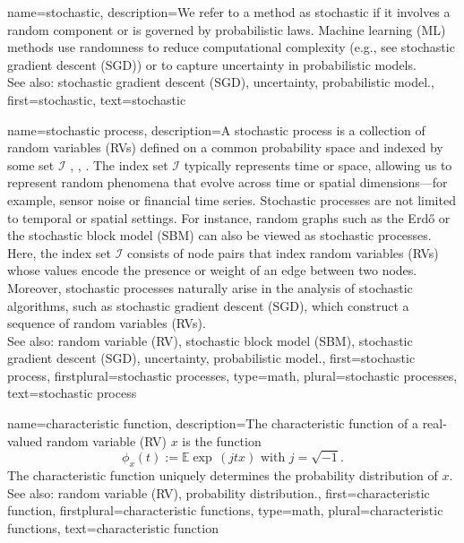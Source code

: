 {name={stochastic},
	description={We refer to a  method as stochastic if it involves a 
		random component or is governed by probabilistic laws. Machine learning (ML) methods use randomness 
		to reduce computational complexity (e.g., see stochastic gradient descent (SGD)) or 
		to capture uncertainty in probabilistic models.
		\\
		See also: stochastic gradient descent (SGD), uncertainty, probabilistic model.},
	first={stochastic},
	text={stochastic}
}

{name={stochastic process},
	description={A stochastic process is a collection of 
		random variables (RVs) defined on a common probability space and indexed by some set 
		$\mathcal{I}$ \cite{GrayProbBook}, \cite{papoulis}, \cite{Brockwell91}. The index set 
		$\mathcal{I}$ typically represents time or space, allowing us to represent 
		random phenomena that evolve across time or spatial dimensions—for example, 
		sensor noise or financial time series. Stochastic processes are not limited 
		to temporal or spatial settings. For instance, random graphs such as 
		the Erd\H{o or the stochastic block model (SBM) can also be viewed as stochastic processes. 
		Here, the index set $\mathcal{I}$ consists of node pairs that index random variables (RVs) whose values 
		encode the presence or weight of an edge between two nodes. Moreover, stochastic 
		processes naturally arise in the analysis of stochastic algorithms, 
		such as stochastic gradient descent (SGD), which construct a sequence of random variables (RVs). 
		\\
		See also:  random variable (RV), stochastic block model (SBM), stochastic gradient descent (SGD), uncertainty, probabilistic model.},
	first={stochastic process},
	firstplural={stochastic processes},
	type=math, 
	plural={stochastic processes},
	text={stochastic process}
}

{name={characteristic function},
	description={The characteristic function 
		of a real-valued random variable (RV) $x$ is the function \cite[Sec. 26]{BillingsleyProbMeasure}
		$$ \phi_{x}(t) := \mathbb{E}  { \exp\,(j t x) } \mbox{ with } j = \sqrt{-1}.$$
	 	The characteristic function uniquely determines the probability distribution of $x$. 
		\\
		See also: random variable (RV), probability distribution.},
	first={characteristic function},
	firstplural={characteristic functions}, 
	type=math, 
	plural={characteristic functions},
	text={characteristic function}
}

}
